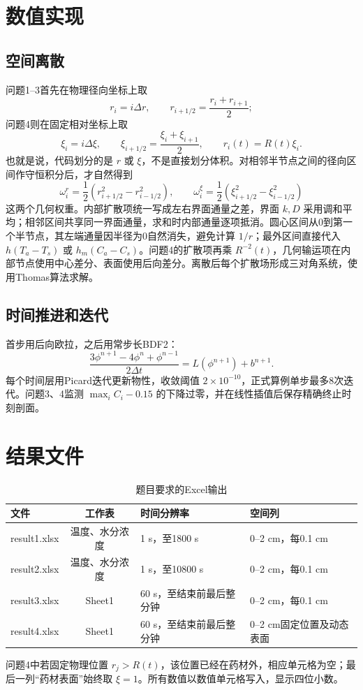 \documentclass[11pt,a4paper]{ctexart}
\begin{document}
\section{数值实现}
\subsection{空间离散}
问题1--3首先在物理径向坐标上取
\[
r_i=i\Delta r,\qquad r_{i+1/2}=\frac{r_i+r_{i+1}}2;
\]
问题4则在固定相对坐标上取
\[
\xi_i=i\Delta\xi,\qquad \xi_{i+1/2}=\frac{\xi_i+\xi_{i+1}}2,
\qquad r_i(t)=R(t)\xi_i.
\]
也就是说，代码划分的是 $r$ 或 $\xi$，不是直接划分体积。对相邻半节点之间的径向区间作守恒积分后，才自然得到
\[
\omega_i^r=\frac12(r_{i+1/2}^2-r_{i-1/2}^2),\qquad
\omega_i^\xi=\frac12(\xi_{i+1/2}^2-\xi_{i-1/2}^2)
\]
这两个几何权重。内部扩散项统一写成左右界面通量之差，界面 $k,D$ 采用调和平均；相邻区间共享同一界面通量，求和时内部通量逐项抵消。圆心区间从0到第一个半节点，其左端通量因半径为0自然消失，避免计算 $1/r$；最外区间直接代入 $h(T_a-T_s)$ 或 $h_m(C_a-C_s)$。问题4的扩散项再乘 $R^{-2}(t)$，几何输运项在内部节点使用中心差分、表面使用后向差分。离散后每个扩散场形成三对角系统，使用Thomas算法求解。

\subsection{时间推进和迭代}
首步用后向欧拉，之后用常步长BDF2：
\[
\frac{3\phi^{n+1}-4\phi^n+\phi^{n-1}}{2\Delta t}=L(\phi^{n+1})+b^{n+1}.
\]
每个时间层用Picard迭代更新物性，收敛阈值 $2\times10^{-10}$，正式算例单步最多8次迭代。问题3、4监测 $\max_iC_i-0.15$ 的下降过零，并在线性插值后保存精确终止时刻剖面。

\section{结果文件}
\begin{table}[H]
\centering
\caption{题目要求的Excel输出}
\begin{tabularx}{\textwidth}{lclX}
\toprule
文件 & 工作表 & 时间分辨率 & 空间列\\
\midrule
result1.xlsx & 温度、水分浓度 & 1 s，至1800 s & 0--2 cm，每0.1 cm\\
result2.xlsx & 温度、水分浓度 & 1 s，至10800 s & 0--2 cm，每0.1 cm\\
result3.xlsx & Sheet1 & 60 s，至结束前最后整分钟 & 0--2 cm，每0.1 cm\\
result4.xlsx & Sheet1 & 60 s，至结束前最后整分钟 & 0--2 cm固定位置及动态表面\\
\bottomrule
\end{tabularx}
\end{table}
问题4中若固定物理位置 $r_j>R(t)$，该位置已经在药材外，相应单元格为空；最后一列“药材表面”始终取 $\xi=1$。所有数值以数值单元格写入，显示四位小数。
\end{document}
